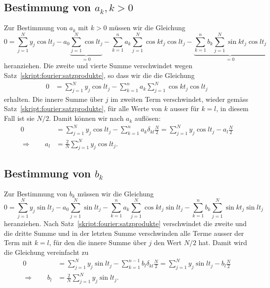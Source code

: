 \subsection{Bestimmung von $a_k, k>0$}
Zur Bestimmung von $a_k$ mit $k>0$ müssen wir die Gleichung
\[
0
=
\sum_{j=1}^N y_j\cos lt_j
-
a_0\underbrace{\sum_{j=1}^N\cos lt_j}_{\displaystyle=0}
-\sum_{k=1}^na_k\sum_{j=1}^N\cos kt_j\cos lt_j
-\underbrace{\sum_{k=1}^nb_k\sum_{j=1}^N\sin kt_j\cos lt_j}_{\displaystyle=0}
\]
heranziehen.
Die zweite und vierte Summe verschwindet wegen
Satz~\ref{skript:fourier:satzprodukte}, so dass wir die die Gleichung
\begin{align*}
0&=
\sum_{j=1}^N y_j\cos lt_j
-\sum_{k=1}^na_k\sum_{j=1}^N\cos kt_j\cos lt_j
\end{align*}
erhalten.
Die innere Summe über $j$ im zweiten Term verschwindet, wieder gemäss 
Satz~\ref{skript:fourier:satzprodukte}, für alle Werte
von $k$ ausser für $k=l$, in diesem Fall ist sie $N/2$. 
Damit können wir nach $a_k$ auflösen:
\begin{align*}
0&
=
\sum_{j=1}^N y_j\cos lt_j
-\sum_{k=1}^na_k\delta_{kl}\frac{N}2
=
\sum_{j=1}^N y_j\cos lt_j
-a_l\frac{N}2
\\
\Rightarrow\qquad 
a_l &= \frac{2}{N}\sum_{j=1}^Ny_j\cos lt_j.
\end{align*}

\subsection{Bestimmung von $b_k$}
Zur Bestimmung von $b_k$ müssen wir die Gleichung
\[
0=\sum_{j=1}^N y_j\sin lt_j 
-a_0\sum_{j=1}^N \sin lt_j
-\sum_{k=1}^na_k\sum_{j=1}^N\cos kt_j\sin lt_j
-\sum_{k=1}^nb_k\sum_{j=1}^N\sin kt_j\sin lt_j
\]
heranziehen.
Nach Satz~\ref{skript:fourier:satzprodukte}
verschwindet die zweite und die dritte Summe 
und in der letzten Summe
verschwinden alle Terme ausser der Term mit $k=l$, für den die
innere Summe über $j$ den Wert $N/2$ hat.
Damit wird die Gleichung vereinfacht zu
\begin{align*}
0
&=
\sum_{j=1}^Ny_j\sin lt_j - \sum_{k=1}^{n-1}b_l\delta_{kl}\frac{N}2
=
\sum_{j=1}^Ny_j\sin lt_j - b_l\frac{N}2
\\
\Rightarrow\qquad
b_l
&=
\frac{2}{N}\sum_{j=1}^Ny_j\sin lt_j.
\end{align*}

